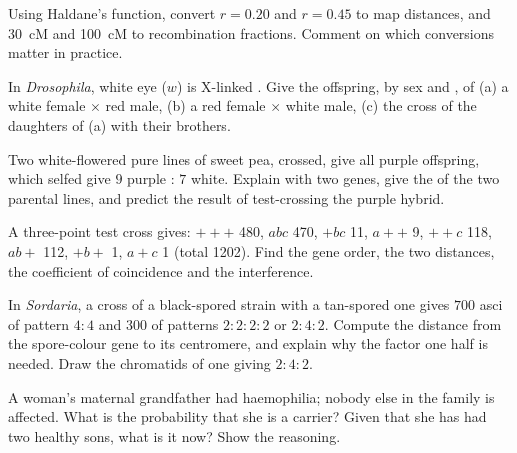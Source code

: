 \begin{exercise}[$\star\star$]\label{exo:b2:meiosis-heredity:7}
Using Haldane's function, convert $r = 0.20$ and $r = 0.45$ to map
distances, and \qty{30}{cM} and \qty{100}{cM} to recombination
fractions. Comment on which conversions matter in practice.
\end{exercise}

\begin{exercise}[$\star\star$]\label{exo:b2:meiosis-heredity:8}
In \emph{Drosophila}, white eye ($w$) is X-linked . Give
the offspring, by sex and , of (a) a white female $\times$
red male, (b) a red  female $\times$ white male, (c) the
cross of the daughters of (a) with their brothers.
\end{exercise}

\begin{exercise}[$\star\star$]\label{exo:b2:meiosis-heredity:9}
Two white-flowered pure lines of sweet pea, crossed, give all
purple offspring, which selfed give $9$ purple : $7$ white.
Explain with two genes, give the  of the two parental
lines, and predict the result of test-crossing the purple hybrid.
\end{exercise}

\begin{exercise}[$\star\star\star$]\label{exo:b2:meiosis-heredity:10}
A three-point test cross gives: $+++$ 480, $abc$ 470, $+bc$ 11,
$a++$ 9, $++c$ 118, $ab+$ 112, $+b+$ 1, $a+c$ 1 (total 1202). Find
the gene order, the two distances, the coefficient of coincidence
and the interference.
\end{exercise}

\begin{exercise}[$\star\star\star$]\label{exo:b2:meiosis-heredity:11}
In \emph{Sordaria}, a cross of a black-spored strain with a
tan-spored one gives $700$ asci of pattern $4 : 4$ and $300$ of
patterns $2 : 2 : 2 : 2$ or $2 : 4 : 2$. Compute the distance from
the spore-colour gene to its centromere, and explain why the factor
one half is needed. Draw the chromatids of one  giving
$2 : 4 : 2$.
\end{exercise}

\begin{exercise}[$\star\star\star$]\label{exo:b2:meiosis-heredity:12}
A woman's maternal grandfather had haemophilia; nobody else in the
family is affected. What is the probability that she is a carrier?
Given that she has had two healthy sons, what is it now? Show the
reasoning.
\end{exercise}

